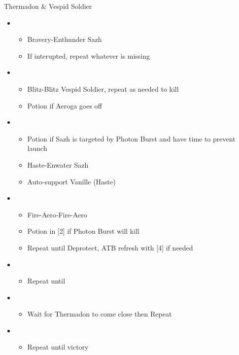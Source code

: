 \begin{paracol}{2}
\begin{battle}{Thermadon \& Vespid Soldier}
		\begin{itemize}
			\item \first
			      \begin{itemize}
				      \item Bravery-Enthunder Sazh
				      \item If interupted, repeat whatever is missing
			      \end{itemize}
			\item \sixth
			      \begin{itemize}
				      \item Blitz-Blitz Vespid Soldier, repeat as needed to kill
				      \item Potion if Aeroga goes off
			      \end{itemize}
			\item \first
			      \begin{itemize}
				      \item Potion if Sazh is targeted by Photon Burst and have time to prevent launch
				      \item Haste-Enwater Sazh
				      \item Auto-support Vanille (Haste)
			      \end{itemize}
			\item \fifth
			      \begin{itemize}
				      \item Fire-Aero-Fire-Aero
				      \item Potion in [2] if Photon Burst will kill
				      \item Repeat until Deprotect, ATB refresh with [4] if needed
			      \end{itemize}
			\item \fourth
			      \begin{itemize}
				      \item Repeat until \stagger
			      \end{itemize}
			\item \second
			      \begin{itemize}
				      \item Wait for Thermadon to come close then Repeat
			      \end{itemize}
			\item \third
			      \begin{itemize}
				      \item Repeat until victory
			      \end{itemize}
		\end{itemize}
	\end{battle}



\end{paracol}
